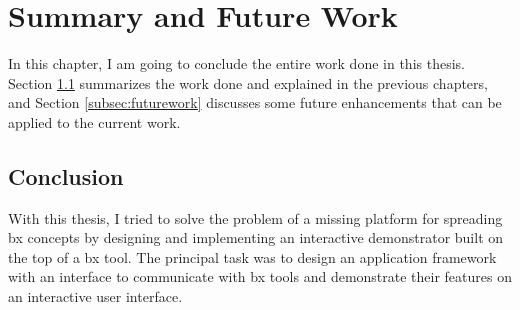 \section{Summary and Future Work}\label{sec:summary}
In this chapter, I am going to conclude the entire work done in this thesis. Section \ref{subsec:conclusion} summarizes the work done and explained in the previous chapters, and  Section \ref{subsec:futurework} discusses some future enhancements that can be applied to the current work.

\subsection{Conclusion}\label{subsec:conclusion}
With this thesis, I tried to solve the problem of a missing platform for spreading bx concepts by designing and implementing an interactive demonstrator built on the top of a bx tool. The principal task was to design an application framework with an interface to communicate with bx tools and demonstrate their features on an interactive user interface.

